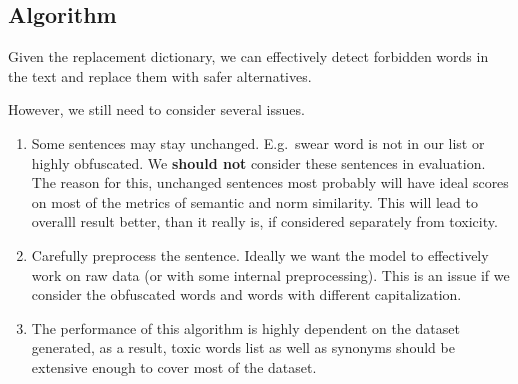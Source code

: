 \subsection{Algorithm}

Given the replacement dictionary, we can effectively detect forbidden words in
the text and replace them with safer alternatives.

However, we still need to consider several issues.

\begin{enumerate}
    \item Some sentences may stay unchanged. E.g.~swear word is not in our list or highly
          obfuscated. We \textbf{should not} consider these sentences in evaluation. The
          reason for this, unchanged sentences most probably will have ideal scores on
          most of the metrics of semantic and norm similarity. This will lead to overalll
          result better, than it really is, if considered separately from toxicity.
    \item Carefully preprocess the sentence. Ideally we want the model to effectively
          work on raw data (or with some internal preprocessing). This is an issue if we
          consider the obfuscated words and words with different capitalization.
    \item The performance of this algorithm is highly dependent on the dataset generated,
          as a result, toxic words list as well as synonyms should be extensive enough to
          cover most of the dataset.
\end{enumerate}